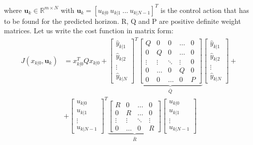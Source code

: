 where $\textbf{u}_k \in \mathbb{R}^{m\times N}$ with $\textbf{u}_k = [u_{k|0}\ u_{k|1}\ ...\ u_{k|N-1}]^T$ is the control action that has to be found for the predicted horizon. R, Q and P are positive definite weight matrices. Let us write the cost function in matrix form: 
\begin{equation*}
\begin{split}
		J(x_{k|0},\textbf{u}_k)&=x_{k|0}^T Q x_{k|0} + 
		\left[ \begin{matrix} \hat{y}_{k|1} \\ \hat{y}_{k|2} \\ \vdots \\ \hat{y}_{k|N}	\end{matrix} \right]^T \underbrace{\left[ \begin{matrix} 
Q	 		&		 0	  	&  	0	  &  \dots  &  0 \\ 
0 			&  	 Q 	  	& 		0 	  &  \dots  &  0 \\
\vdots  	& 	  \vdots  	&   \ddots   &  \vdots &  0 \\
0 			& 	  \dots  	&      0     &      Q  &  0 \\
0			& 		 0 		&	  \dots   &      0  &  P
\end{matrix} \right]}_{\bar{Q}}
\left[ \begin{matrix} \hat{y}_{k|1} \\ \hat{y}_{k|2} \\ \vdots \\ \hat{y}_{k|N} \end{matrix} \right] +  \\ 
&+\left[ \begin{matrix} u_{k|0} \\ u_{k|1} \\ \vdots \\ u_{k|N-1} 		\end{matrix} \right]^T \underbrace{\left[ \begin{matrix} 
R	 		&		 0	  	&     \dots   &  0 \\ 
0 			&  	     R 	  	&     \dots	  &  0 \\
\vdots  	& 	  \vdots  	&    \ddots   &  \vdots \\
0			& 	  \dots     &        0    &  R
\end{matrix} \right]}_{\bar{R}}
\left[ \begin{matrix} u_{k|0} \\ u_{k|1} \\ \vdots \\ u_{k|N-1}  \end{matrix} \right] 
\end{split}
\end{equation*}

